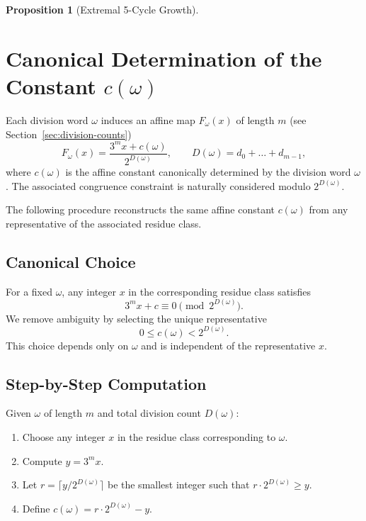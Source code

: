 \documentclass[12pt, oneside]{article}
\numberwithin{equation}{section}
\theoremstyle{definition}
\newtheorem{proposition}{Proposition}[section]
\theoremstyle{plain}
\theoremstyle{remark}
\begin{document}
\begin{proposition}[Extremal 5-Cycle Growth]
\appendix

\newpage
\section{Canonical Determination of the Constant \(c(\omega)\)}
\label{app:canonical-c}

Each division word \(\omega\) induces an affine map \(F_\omega(x)\) of length $m$
(see Section~\ref{sec:division-counts})
\[
F_\omega(x) = \frac{3^m x + c(\omega)}{2^{D(\omega)}}, \qquad D(\omega) = d_0 + \dots + d_{m-1},
\]
where \(c(\omega)\) is the affine constant canonically determined by the
division word \(\omega\).  The associated congruence constraint is naturally
considered modulo \(2^{D(\omega)}\).

The following procedure reconstructs the same affine constant \(c(\omega)\)
from any representative of the associated residue class.

\subsection{Canonical Choice}

For a fixed \(\omega\), any integer \(x\) in the corresponding residue class satisfies
\[
3^m x + c \equiv 0 \pmod{2^{D(\omega)}}.
\]
We remove ambiguity by selecting the unique representative
\[
0 \le c(\omega) < 2^{D(\omega)}.
\]
This choice depends only on \(\omega\) and is independent of the representative \(x\).

\subsection{Step-by-Step Computation}

Given \(\omega\) of length \(m\) and total division count \(D(\omega)\):

\begin{enumerate}
\item Choose any integer \(x\) in the residue class corresponding to \(\omega\).  
\item Compute \(y = 3^m x\).  
\item Let \(r = \lceil y / 2^{D(\omega)} \rceil\) be the smallest integer such that \(r \cdot 2^{D(\omega)} \ge y\).  
\item Define \(c(\omega) = r \cdot 2^{D(\omega)} - y\).  
\end{enumerate}


\end{proposition}
\end{document}
